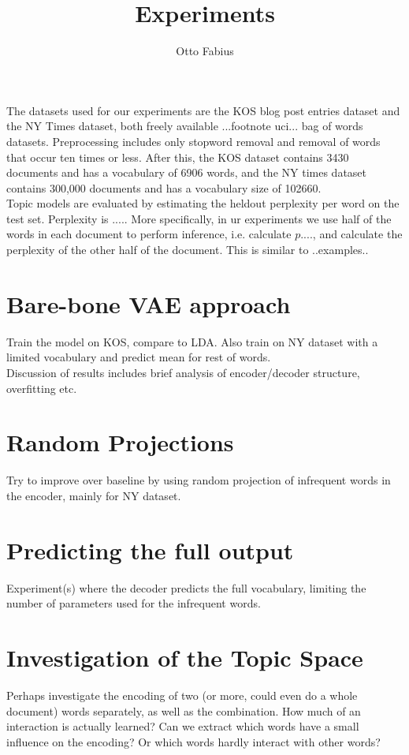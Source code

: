 \documentclass{article}
\author{Otto Fabius}
\title{Experiments}
\begin{document}
\maketitle



The datasets used for our experiments are the KOS blog post entries dataset and the NY Times dataset, both freely available ...footnote uci... bag of words datasets. Preprocessing includes only stopword removal and removal of words that occur ten times or less. After this, the KOS dataset contains 3430 documents and has a vocabulary of 6906 words, and the NY times dataset contains 300,000 documents and has a vocabulary size of 102660. \\
Topic models are evaluated by estimating the heldout perplexity per word on the test set. Perplexity is ..... More specifically, in ur experiments we use half of the words in each document to perform inference, i.e. calculate $p....$, and calculate the perplexity of the other half of the document. This is similar to ..examples..

\section{Bare-bone VAE approach}

Train the model on KOS, compare to LDA. Also train on NY dataset with a limited vocabulary and predict mean for rest of words. \\
Discussion of results includes brief analysis of encoder/decoder structure, overfitting etc.

\section{Random Projections}
Try to improve over baseline by using random projection of infrequent words in the encoder, mainly for NY dataset.

\section{Predicting the full output}
Experiment(s) where the decoder predicts the full vocabulary, limiting the number of parameters used for the infrequent words.

\section{Investigation of the Topic Space}
Perhaps investigate the encoding of two (or more, could even do a whole document) words separately, as well as the combination. How much of an interaction is actually learned? Can we extract which words have a small influence on the encoding? Or which words hardly interact with other words?
\end{document}

